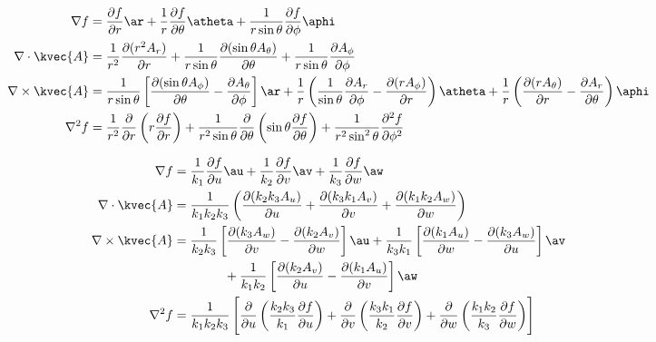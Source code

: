 \begin{align*}
\nabla f &=\frac{\partial f}{\partial r}\ar+\frac{1}{r}\frac{\partial f}{\partial \theta}\atheta+\frac{1}{r \sin \theta}\frac{\partial f}{\partial \phi}\aphi\\
\nabla \cdot \kvec{A}&=\frac{1}{r^2}\frac{\partial (r^2 A_r)}{\partial r}+\frac{1}{r \sin \theta }\frac{\partial ( \sin \theta A_{\theta})}{\partial \theta}+\frac{1}{r \sin \theta}\frac{\partial A_{\phi}}{\partial \phi}\\
\nabla \times \kvec{A}&=\frac{1}{r \sin \theta}\left[\frac{\partial (\sin \theta A_{\phi})}{\partial \theta}-\frac{\partial A_{\theta}}{\partial \phi} \right]\ar+\frac{1}{r}\left(\frac{1}{\sin \theta}\frac{\partial A_r}{\partial \phi}-\frac{\partial (r A_{\phi})}{\partial r} \right)\atheta+\frac{1}{r}\left(\frac{\partial (r A_{\theta})}{\partial r}-\frac{\partial A_r}{\partial \theta} \right)\aphi \\
\nabla^2 f &=\frac{1}{r^2}\frac{\partial}{\partial r}\left(r \frac{\partial f}{\partial r} \right)+\frac{1}{r^2 \sin \theta}\frac{\partial}{\partial \theta}\left(\sin \theta \frac{\partial f}{\partial \theta} \right)+\frac{1}{r^2 \sin^2 \theta}\frac{\partial^2  f}{\partial {\phi}^2}
\end{align*}


\begin{align*}
\nabla f &=\frac{1}{k_1}\frac{\partial f}{\partial u}\au+\frac{1}{k_2}\frac{\partial f}{\partial v}\av+\frac{1}{k_3}\frac{\partial f}{\partial w}\aw\\
\nabla \cdot \kvec{A}&=\frac{1}{k_1 k_2 k_3}\left(\frac{\partial (k_2 k_3 A_u)}{\partial u}+\frac{\partial ( k_3 k_1 A_v)}{\partial v}+\frac{\partial (k_1 k_2 A_w)}{\partial w}\right)\\
\nabla \times \kvec{A}&=\frac{1}{k_2 k_3}\left[\frac{\partial (k_3 A_w)}{\partial v}-\frac{\partial (k_2 A_v)}{\partial w} \right]\au+\frac{1}{k_3 k_1}\left[\frac{\partial (k_1 A_u)}{\partial w}-\frac{\partial (k_3 A_w)}{\partial u} \right]\av\\
& \quad \quad \quad \quad +\frac{1}{k_1 k_2}\left[\frac{\partial (k_2 A_v)}{\partial u}-\frac{\partial (k_1 A_u)}{\partial v} \right]\aw \\
\nabla^2 f &=\frac{1}{k_1 k_2 k_3} \left[\frac{\partial}{\partial u}\left(\frac{k_2 k_3}{k_1}\frac{\partial f}{\partial u} \right)+\frac{\partial}{\partial v}\left(\frac{k_3 k_1}{k_2}\frac{\partial f}{\partial v} \right)+\frac{\partial}{\partial w}\left(\frac{k_1 k_2}{k_3}\frac{\partial f}{\partial w} \right)\right]
\end{align*}

